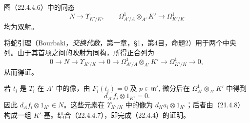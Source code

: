 图（22.4.4.6）中的同态
\[
 N\longrightarrow\Upsilon_{K'/K},\qquad
 \Omega^1_{A'/A}\otimes_{A'}K'\longrightarrow\Omega^1_{K'/K}
\]
均为双射。

\eproof
将蛇引理（Bourbaki，\textit{交换代数}，第一章，§1，第4目，命题2）用于两个中央列。由于其首项之间的映射为同构，所得正合列为
\[
 0\longrightarrow N\longrightarrow\Upsilon_{K'/K}\longrightarrow0
 \longrightarrow\Omega^1_{A'/A}\otimes_{A'}K'
 \longrightarrow\Omega^1_{K'/K}\longrightarrow0,
\]
从而得证。
\finishproof

若 $t_i$ 是 $T_i$ 在 $A'$ 中的像，由 $F_i(t_i)=0$ 及 $p\in\mathfrak m'$, 微分后在 $\Omega^1_{A'}\otimes_{A'}K'$ 中得到
\[
 d_{A'}f_i\otimes1_{K'}=0.
\]
因此 $d_Af_i\otimes1_{K'}\in N$。这些元素在 $\Upsilon_{K'/K}$ 中的像为 $d_Ka_i\otimes1_{K'}$；后者由（21.4.8）构成一组 $K'$-基。结合（22.4.4.7），即完成（22.4.4）的证明。
\finishproof
